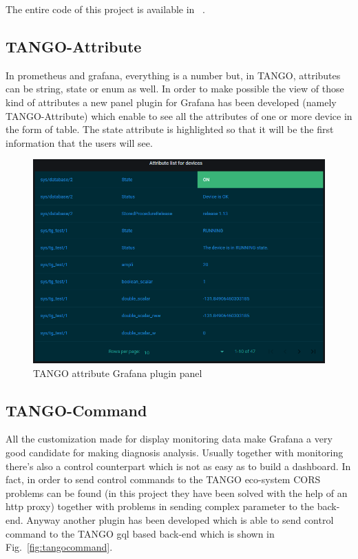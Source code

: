 \documentclass[]{spie}  %
\begin{document}
The entire code of this project is available in ~\cite{tango-grafana}.

\subsection{TANGO-Attribute} \label{TANGO-Attribute}

In prometheus and grafana, everything is a number but, in TANGO, attributes can be string, state or enum as well. In order to make possible the view of those kind of attributes a new panel plugin for Grafana has been developed (namely TANGO-Attribute) which enable to see all the attributes of one or more device in the form of table. The state attribute is highlighted so that it will be the first information that the users will see. 

\begin{figure}[!htb]
   \centering
   \includegraphics*[width=0.6\columnwidth]{tango attribute}
       \caption{TANGO attribute Grafana plugin panel}
   \label{fig:tangoattribute}
\end{figure}

\subsection{TANGO-Command} \label{TANGO-Command}

All the customization made for display monitoring data make Grafana a very good candidate for making diagnosis analysis. Usually together with monitoring there's also a control counterpart which is not as easy as to build a dashboard. In fact, in order to send control commands to the TANGO eco-system CORS~\cite{cors} problems can be found (in this project they have been solved with the help of an http proxy) together with problems in sending complex parameter to the back-end. 
Anyway another plugin has been developed which is able to send control command to the TANGO gql based back-end which is shown in Fig.~\ref{fig:tangocommand}.
\end{document}
